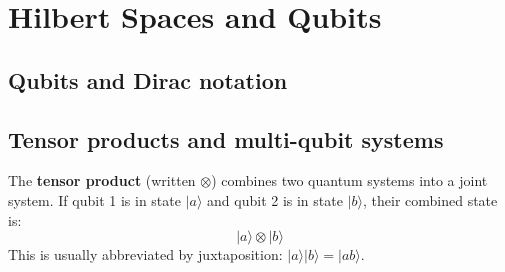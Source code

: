 
\section{Hilbert Spaces and Qubits}

\subsection{Qubits and Dirac notation}


\subsection{Tensor products and multi-qubit systems}

\begin{definition}
The \textbf{tensor product} (written $\otimes$) combines two quantum systems into a joint system. If qubit 1 is in state $|a\rangle$ and qubit 2 is in state $|b\rangle$, their combined state is:
\[
|a\rangle \otimes |b\rangle
\]
This is usually abbreviated by juxtaposition: $|a\rangle|b\rangle = |ab\rangle$.
\end{definition}

